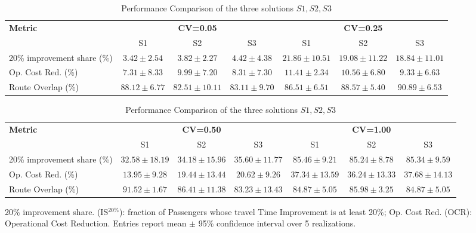 \documentclass[a4paper,fleqn]{cas-sc}
\begin{document}
\begin{table}
\centering
\scriptsize
\setlength{\tabcolsep}{2.5pt}
\begin{threeparttable}

\begin{tabular}{lcccccc}
\toprule
\textbf{Metric} 
  & \multicolumn{3}{c}{\textbf{CV=0.05}} 
  & \multicolumn{3}{c}{\textbf{CV=0.25}} \\
\cmidrule(lr){2-4} \cmidrule(lr){5-7}
& S1 & S2 & S3 & S1 & S2 & S3 \\
\midrule
20\% improvement share (\%) 
  & $3.42\pm2.54$ & $3.82\pm2.27$ & $4.42\pm4.38$ 
  & $21.86\pm10.51$ & $19.08\pm11.22$ & $18.84\pm11.01$ \\
Op. Cost Red. (\%) 
  & $7.31\pm8.33$ & $9.99\pm7.20$ & $8.31\pm7.30$ 
  & $11.41\pm2.34$ & $10.56\pm6.80$ & $9.33\pm6.63$ \\
Route Overlap (\%) 
  & $88.12\pm6.77$ & $82.51\pm10.11$ & $83.11\pm9.70$ 
  & $86.51\pm6.51$ & $88.57\pm5.40$ & $90.89\pm6.53$ \\
\bottomrule
\end{tabular}

\vspace{0.5em}

\begin{tabular}{lcccccc}
\toprule
\textbf{Metric} 
  & \multicolumn{3}{c}{\textbf{CV=0.50}} 
  & \multicolumn{3}{c}{\textbf{CV=1.00}} \\
\cmidrule(lr){2-4} \cmidrule(lr){5-7}
& S1 & S2 & S3 & S1 & S2 & S3 \\
\midrule
20\% improvement share (\%) 
  & $32.58\pm18.19$ & $34.18\pm15.96$ & $35.60\pm11.77$ 
  & $85.46\pm9.21$ & $85.24\pm8.78$ & $85.34\pm9.59$ \\
Op. Cost Red. (\%) 
  & $13.95\pm9.28$ & $19.44\pm13.44$ & $20.62\pm9.26$ 
  & $37.34\pm13.59$ & $36.24\pm13.33$ & $37.68\pm14.13$ \\
Route Overlap (\%) 
  & $91.52\pm1.67$ & $86.41\pm11.38$ & $83.23\pm13.43$ 
  & $84.87\pm5.05$ & $85.98\pm3.25$ & $84.87\pm5.05$ \\
\bottomrule
\end{tabular}

\begin{tablenotes}
\item 20\% improvement share. (IS$^{20\%}$): fraction of Passengers whose travel Time Improvement is at least 20\%; 
Op. Cost Red. (OCR): Operational Cost Reduction. 
Entries report mean $\pm$ 95\% confidence interval over 5 realizations.
\end{tablenotes}

\end{threeparttable}
\caption{Performance Comparison of the three solutions $S1, S2, S3$}
\label{tab:randomSEED}
\end{table}
\end{document}
